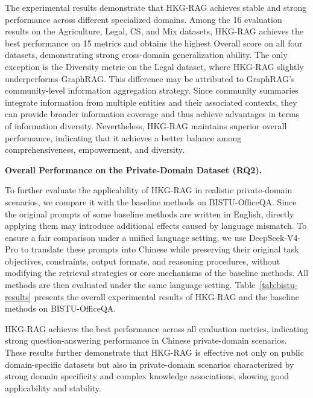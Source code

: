 \documentclass[preprint,12pt,authoryear]{elsarticle}
\begin{document}
The experimental results demonstrate that HKG-RAG achieves stable and strong performance across different specialized domains. Among the 16 evaluation results on the Agriculture, Legal, CS, and Mix datasets, HKG-RAG achieves the best performance on 15 metrics and obtains the highest Overall score on all four datasets, demonstrating strong cross-domain generalization ability. The only exception is the Diversity metric on the Legal dataset, where HKG-RAG slightly underperforms GraphRAG. This difference may be attributed to GraphRAG’s community-level information aggregation strategy. Since community summaries integrate information from multiple entities and their associated contexts, they can provide broader information coverage and thus achieve advantages in terms of information diversity. Nevertheless, HKG-RAG maintains superior overall performance, indicating that it achieves a better balance among comprehensiveness, empowerment, and diversity.

\FloatBarrier

%
\noindent\textbf{Overall Performance on the Private-Domain Dataset (RQ2).}

To further evaluate the applicability of HKG-RAG in realistic private-domain scenarios, we compare it with the baseline methods on BISTU-OfficeQA. Since the original prompts of some baseline methods are written in English, directly applying them may introduce additional effects caused by language mismatch. To ensure a fair comparison under a unified language setting, we use DeepSeek-V4-Pro to translate these prompts into Chinese while preserving their original task objectives, constraints, output formats, and reasoning procedures, without modifying the retrieval strategies or core mechanisms of the baseline methods. All methods are then evaluated under the same language setting.
Table~\ref{tab:bistu-results} presents the overall experimental results of HKG-RAG and the baseline methods on BISTU-OfficeQA.


\FloatBarrier

HKG-RAG achieves the best performance across all evaluation metrics, indicating strong question-answering performance in Chinese private-domain scenarios. These results further demonstrate that HKG-RAG is effective not only on public domain-specific datasets but also in private-domain scenarios characterized by strong domain specificity and complex knowledge associations, showing good applicability and stability.
\end{document}
